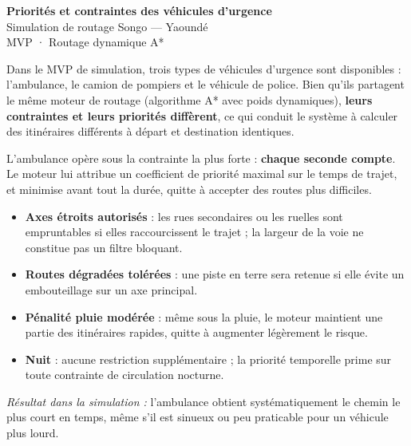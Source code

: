 \documentclass[12pt,a4paper]{article}
\begin{document}
\begin{center}
  {\LARGE\bfseries Priorités et contraintes des véhicules d'urgence}\\[6pt]
  {\large Simulation de routage Songo — Yaoundé}\\[3pt]
  {\small\color{gray} MVP · Routage dynamique A*}
\end{center}

\vspace{0.5cm}

\noindent
Dans le MVP de simulation, trois types de véhicules d'urgence sont disponibles :
l'ambulance, le camion de pompiers et le véhicule de police.
Bien qu'ils partagent le même moteur de routage (algorithme A* avec poids dynamiques),
\textbf{leurs contraintes et leurs priorités diffèrent}, ce qui conduit le système
à calculer des itinéraires différents à départ et destination identiques.

\bigskip

\begin{tcolorbox}[colback=rougeclair, colframe=urgence, fonttitle=\bfseries\large,
  title={[Ambulance] Ambulance — Priorité absolue : rapidité},
  breakable, sharp corners=south]

L'ambulance opère sous la contrainte la plus forte : \textbf{chaque seconde compte}.
Le moteur lui attribue un coefficient de priorité maximal sur le temps de trajet,
et minimise avant tout la durée, quitte à accepter des routes plus difficiles.

\begin{itemize}[leftmargin=1.5em, itemsep=3pt]
  \item \textbf{Axes étroits autorisés} : les rues secondaires ou les ruelles sont
        empruntables si elles raccourcissent le trajet ; la largeur de la voie
        ne constitue pas un filtre bloquant.
  \item \textbf{Routes dégradées tolérées} : une piste en terre sera retenue si
        elle évite un embouteillage sur un axe principal.
  \item \textbf{Pénalité pluie modérée} : même sous la pluie, le moteur maintient
        une partie des itinéraires rapides, quitte à augmenter légèrement le risque.
  \item \textbf{Nuit} : aucune restriction supplémentaire ; la priorité temporelle
        prime sur toute contrainte de circulation nocturne.
\end{itemize}

\smallskip
\textit{Résultat dans la simulation :} l'ambulance obtient systématiquement
le chemin le plus court en temps, même s'il est sinueux ou peu praticable
pour un véhicule plus lourd.

\end{tcolorbox}
\end{document}
